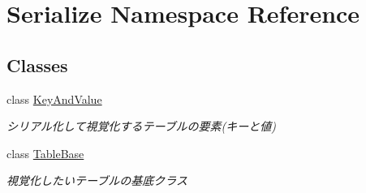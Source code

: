 \hypertarget{namespace_serialize}{}\section{Serialize Namespace Reference}
\label{namespace_serialize}
\subsection*{Classes}
\begin{DoxyCompactItemize}
\item 
class \hyperlink{class_serialize_1_1_key_and_value}{Key\+And\+Value}
\begin{DoxyCompactList}\small\item\em シリアル化して視覚化するテーブルの要素(キーと値) \end{DoxyCompactList}\item 
class \hyperlink{class_serialize_1_1_table_base}{Table\+Base}
\begin{DoxyCompactList}\small\item\em 視覚化したいテーブルの基底クラス \end{DoxyCompactList}\end{DoxyCompactItemize}
